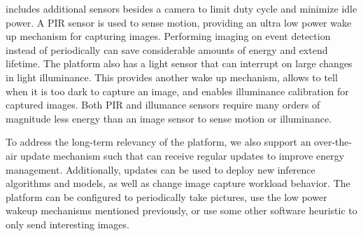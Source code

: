 \name includes additional sensors besides a camera to limit duty cycle and minimize idle power. A PIR sensor is used to sense motion, providing an ultra low power wake up mechanism for capturing images. Performing imaging on event detection instead of periodically can save considerable amounts of energy and extend lifetime. The platform also has a light sensor that can interrupt on large changes in light illuminance. This provides another wake up mechanism, allows \name to tell when it is too dark to capture an image, and enables illuminance calibration for captured images. Both PIR and illumance sensors require many orders of magnitude less energy than an image sensor to sense motion or illuminance.

To address the long-term relevancy of the platform, we also support an over-the-air update mechanism such that \name can receive regular updates to improve energy management. Additionally, updates can be used to deploy new inference algorithms and models, as well as change image capture workload behavior. The platform can be configured to periodically take pictures, use the low power wakeup mechanisms mentioned previously, or use some other software heuristic to only send interesting images.

